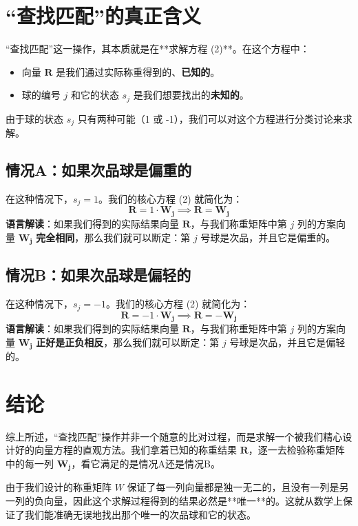 \documentclass[12pt, a4paper]{ctexart}
\begin{document}
\section{“查找匹配”的真正含义}

“查找匹配”这一操作，其本质就是在**求解方程 (2)**。在这个方程中：
\begin{itemize}
    \item 向量 $\mathbf{R}$ 是我们通过实际称重得到的、\textbf{已知的}。
    \item 球的编号 $j$ 和它的状态 $s_j$ 是我们想要找出的\textbf{未知的}。
\end{itemize}
由于球的状态 $s_j$ 只有两种可能（1 或 -1），我们可以对这个方程进行分类讨论来求解。

\subsection{情况A：如果次品球是偏重的}
在这种情况下，$s_j = 1$。我们的核心方程 (2) 就简化为：
$$ \mathbf{R} = 1 \cdot \mathbf{W_j} \implies \mathbf{R} = \mathbf{W_j} $$
\textbf{语言解读}：如果我们得到的实际结果向量 $\mathbf{R}$，与我们称重矩阵中第 $j$ 列的方案向量 $\mathbf{W_j}$ \textbf{完全相同}，那么我们就可以断定：第 $j$ 号球是次品，并且它是偏重的。

\subsection{情况B：如果次品球是偏轻的}
在这种情况下，$s_j = -1$。我们的核心方程 (2) 就简化为：
$$ \mathbf{R} = -1 \cdot \mathbf{W_j} \implies \mathbf{R} = -\mathbf{W_j} $$
\textbf{语言解读}：如果我们得到的实际结果向量 $\mathbf{R}$，与我们称重矩阵中第 $j$ 列的方案向量 $\mathbf{W_j}$ \textbf{正好是正负相反}，那么我们就可以断定：第 $j$ 号球是次品，并且它是偏轻的。

\section{结论}
综上所述，“查找匹配”操作并非一个随意的比对过程，而是求解一个被我们精心设计好的向量方程的直观方法。我们拿着已知的称重结果 $\mathbf{R}$，逐一去检验称重矩阵中的每一列 $\mathbf{W_j}$，看它满足的是情况A还是情况B。

由于我们设计的称重矩阵 $W$ 保证了每一列向量都是独一无二的，且没有一列是另一列的负向量，因此这个求解过程得到的结果必然是**唯一**的。这就从数学上保证了我们能准确无误地找出那个唯一的次品球和它的状态。
\end{document}
